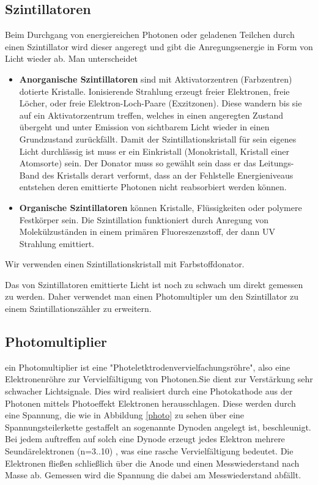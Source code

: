 \documentclass[12pt]{article}
\begin{document}
\subsection{Szintillatoren}
Beim Durchgang von energiereichen Photonen oder geladenen Teilchen durch einen Szintillator wird dieser angeregt und gibt die Anregungsenergie in Form von Licht wieder ab.
Man unterscheidet
\begin{itemize}
 \item \textbf{Anorganische Szintillatoren}
  sind mit Aktivatorzentren (Farbzentren) dotierte Kristalle. Ionisierende Strahlung erzeugt freier Elektronen, freie Löcher, oder freie Elektron-Loch-Paare (Exzitzonen).
  Diese wandern bis sie auf ein Aktivatorzentrum treffen, welches in einen angeregten Zustand übergeht und unter Emission von sichtbarem Licht wieder in einen Grundzustand 						zurückfällt. Damit der Szintillationskristall für sein eigenes Licht durchlässig ist muss er ein Einkristall (Monokristall, Kristall einer Atomsorte) sein. Der Donator muss so gewählt sein
  dass er das Leitungs- Band des Kristalls derart verformt, dass an der Fehlstelle Energieniveaus entstehen deren emittierte Photonen nicht reabsorbiert werden können.
 \item \textbf{Organische Szintillatoren}
  können Kristalle, Flüssigkeiten oder polymere Festkörper sein. Die Szintillation funktioniert durch Anregung von Molekülzuständen in einem primären Fluoreszenzstoff, der 
  dann UV Strahlung emittiert.
\end{itemize}
Wir verwenden einen Szintillationskristall mit Farbstoffdonator.\newline

Das von Szintillatoren emittierte Licht ist noch zu schwach um direkt gemessen zu werden. Daher verwendet man einen Photomultipler um den Szintillator zu einem Szintillationszähler zu erweitern.

\subsection{Photomultiplier}

ein Photomultiplier ist eine "Photeletktrodenvervielfachungsröhre", also eine Elektronenröhre zur Vervielfältigung von Photonen.Sie dient zur Verstärkung sehr schwacher Lichtsignale. Dies wird realisiert durch 
eine Photokathode aus der Photonen mittels Photoeffekt Elektronen herausschlagen. Diese werden durch eine Spannung, die wie in Abbildung \ref{photo} zu sehen über eine Spannungsteilerkette gestaffelt an sogenannte Dynoden angelegt ist, beschleunigt. 
Bei jedem auftreffen auf solch eine Dynode erzeugt jedes Elektron mehrere Seundärelektronen (n=3..10) , was eine rasche Vervielfältigung bedeutet. Die Elektronen fließen schließlich über die Anode und einen Messwiederstand nach Masse ab. Gemessen wird die Spannung die dabei am Messwiederstand abfällt. \newline
\end{document}
